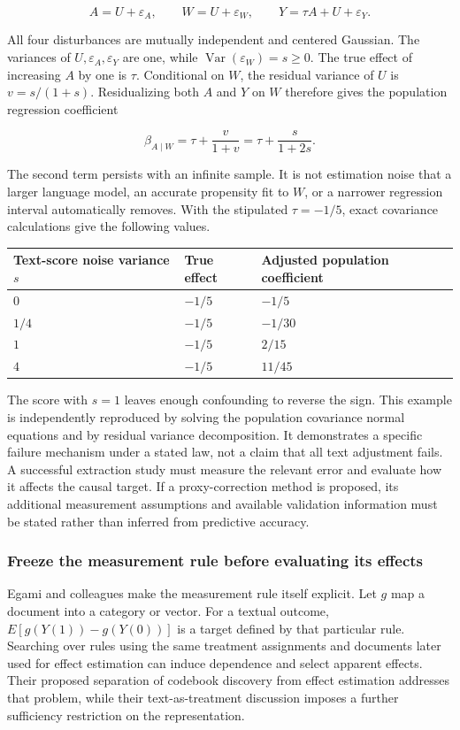 \[
 A=U+\varepsilon_A,\qquad
 W=U+\varepsilon_W,\qquad
 Y=\tau A+U+\varepsilon_Y.
\]

All four disturbances are mutually independent and centered Gaussian.
The variances of \(U,\varepsilon_A,\varepsilon_Y\) are one, while
\(\operatorname{Var}(\varepsilon_W)=s\geq0\). The true effect of
increasing \(A\) by one is \(\tau\). Conditional on \(W\), the residual
variance of \(U\) is \(v=s/(1+s)\). Residualizing both \(A\) and \(Y\)
on \(W\) therefore gives the population regression coefficient

\[
 \beta_{A\mid W}
 =\tau+\frac{v}{1+v}
 =\tau+\frac{s}{1+2s}.
\]

The second term persists with an infinite sample. It is not estimation
noise that a larger language model, an accurate propensity fit to \(W\),
or a narrower regression interval automatically removes. With the
stipulated \(\tau=-1/5\), exact covariance calculations give the
following values.

\begin{longtable}[]{@{}lll@{}}
\toprule
Text-score noise variance \(s\) & True effect & Adjusted population
coefficient\tabularnewline
\midrule
\endhead
\(0\) & \(-1/5\) & \(-1/5\)\tabularnewline
\(1/4\) & \(-1/5\) & \(-1/30\)\tabularnewline
\(1\) & \(-1/5\) & \(2/15\)\tabularnewline
\(4\) & \(-1/5\) & \(11/45\)\tabularnewline
\bottomrule
\end{longtable}

The score with \(s=1\) leaves enough confounding to reverse the sign.
This example is independently reproduced by solving the population
covariance normal equations and by residual variance decomposition. It
demonstrates a specific failure mechanism under a stated law, not a
claim that all text adjustment fails. A successful extraction study must
measure the relevant error and evaluate how it affects the causal
target. If a proxy-correction method is proposed, its additional
measurement assumptions and available validation information must be
stated rather than inferred from predictive accuracy.

\hypertarget{freeze-the-measurement-rule-before-evaluating-its-effects}{%
\subsubsection{Freeze the measurement rule before evaluating its
effects}\label{freeze-the-measurement-rule-before-evaluating-its-effects}}

Egami and colleagues make the measurement rule itself explicit. Let
\(g\) map a document into a category or vector. For a textual outcome,
\(E[g(Y(1))-g(Y(0))]\) is a target defined by that particular rule.
Searching over rules using the same treatment assignments and documents
later used for effect estimation can induce dependence and select
apparent effects. Their proposed separation of codebook discovery from
effect estimation addresses that problem, while their text-as-treatment
discussion imposes a further sufficiency restriction on the
representation. \cite{exec13_census_texts}

